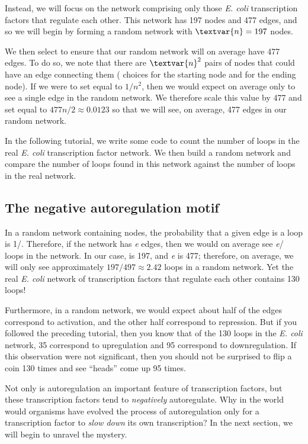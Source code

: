 Instead, we will focus on the network comprising only those \textit{E. coli} transcription factors that regulate each other. This network has 197 nodes and 477 edges, and so we will begin by forming a random network with $\textvar{n} = 197$ nodes.

We then select  to ensure that our random network will on average have 477 edges. To do so, we note that there are $\textvar{n}^2$ pairs of nodes that could have an edge connecting them ( choices for the starting node and  for the ending node). If we were to set  equal to $1/n^2$, then we would expect on average only to see a single edge in the random network. We therefore scale this value by 477 and set  equal to $477n/2 \approx 0.0123$ so that we will see, on average, 477 edges in our random network.

In the following tutorial, we write some code to count the number of loops in the real \textit{E. coli} transcription factor network. We then build a random network and compare the number of loops found in this network against the number of loops in the real network.

\FloatBarrier
{}
\subsection{The negative autoregulation motif}

In a random network containing  nodes, the probability that a given edge is a loop is 1/. Therefore, if the network has \textit{e} edges, then we would on average see \textit{e}/ loops in the network. In our case,  is 197, and \textit{e} is 477; therefore, on average, we will only see approximately $197/497 \approx 2.42$ loops in a random network. Yet the real \textit{E. coli} network of transcription factors that regulate each other contains 130 loops!

Furthermore, in a random network, we would expect about half of the edges correspond to activation, and the other half correspond to repression. But if you followed the preceding tutorial, then you know that of the 130 loops in the \textit{E. coli} network, 35 correspond to upregulation and 95 correspond to downregulation. If this observation were not significant, then you should not be surprised to flip a coin 130 times and see ``heads'' come up 95 times.

Not only is autoregulation an important feature of transcription factors, but these transcription factors tend to \textit{negatively} autoregulate. Why in the world would organisms have evolved the process of autoregulation only for a transcription factor to \textit{slow down} its own transcription? In the next section, we will begin to unravel the mystery.\\


